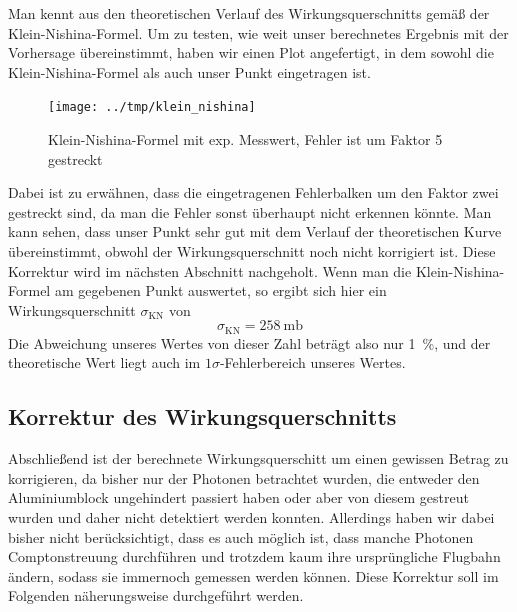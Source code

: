 Man kennt aus \cite[Gl.3]{script} den theoretischen Verlauf des Wirkungsquerschnitts
gemäß der Klein-Nishina-Formel. Um zu testen, wie weit unser berechnetes Ergebnis mit
der Vorhersage übereinstimmt, haben wir einen Plot  angefertigt,
in dem sowohl die Klein-Nishina-Formel als auch unser Punkt eingetragen ist.
\begin{figure}[htb]
      \centering
      \texttt{[image: ../tmp/klein\_nishina]}
      \caption{Klein-Nishina-Formel mit exp. Messwert, Fehler ist um Faktor 5 gestreckt}
      \label{fig:klein_nishina}
\end{figure}
Dabei ist zu erwähnen, dass die eingetragenen Fehlerbalken um den Faktor zwei
gestreckt sind, da man die Fehler sonst überhaupt nicht erkennen könnte. Man kann
sehen, dass unser Punkt sehr gut mit dem Verlauf der theoretischen Kurve übereinstimmt,
obwohl der Wirkungsquerschnitt noch nicht korrigiert ist. Diese Korrektur wird im
nächsten Abschnitt nachgeholt. Wenn man die Klein-Nishina-Formel am gegebenen Punkt
auswertet, so ergibt sich hier ein Wirkungsquerschnitt $\sigma_{\mathrm{KN}}$ von
\begin{equation}
\sigma_{\mathrm{KN}} = \SI{258}{\milli\barn}
\end{equation}
Die Abweichung unseres Wertes von dieser Zahl beträgt also nur \SI{1}{\percent},
und der theoretische Wert liegt auch im $1\sigma$-Fehlerbereich unseres Wertes.

\subsection{Korrektur des Wirkungsquerschnitts}
Abschließend ist der berechnete Wirkungsquerschitt um einen gewissen Betrag zu
korrigieren, da bisher nur der Photonen betrachtet wurden, die entweder den
Aluminiumblock ungehindert passiert haben oder aber von diesem gestreut wurden
und daher nicht detektiert werden konnten. Allerdings haben wir dabei bisher
nicht berücksichtigt, dass es auch möglich ist, dass manche Photonen
Comptonstreuung durchführen und trotzdem kaum ihre ursprüngliche Flugbahn
ändern, sodass sie immernoch gemessen werden können. Diese Korrektur soll im
Folgenden näherungsweise durchgeführt werden.

